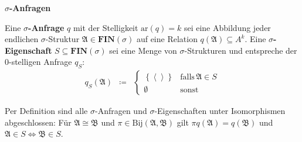\begin{defn}
\textbf{$\sigma$-Anfragen}

Eine $\sigma$\textbf{-Anfrage} $q$ mit der Stelligkeit $\mathrm{ar}\left(q\right)=k$
sei eine Abbildung jeder endlichen $\sigma$-Struktur $\mathfrak{A}\in\mathbf{FIN}\left(\sigma\right)$
auf eine Relation $q\left(\mathfrak{A}\right)\subseteq A^{k}$. Eine
$\sigma$\textbf{-Eigenschaft} $S\subseteq\mathbf{FIN}\left(\sigma\right)$
sei eine Menge von $\sigma$-Strukturen und entspreche der 0-stelligen
Anfrage $q_{S}$:
\begin{eqnarray*}
q_{S}\left(\mathfrak{A}\right) & \coloneqq & \begin{cases}
\left\{ \left\langle \right\rangle \right\}  & \mathrm{falls}\,\mathfrak{A}\in S\\
\emptyset & \mathrm{sonst}
\end{cases}
\end{eqnarray*}

Per Definition sind alle $\sigma$-Anfragen und $\sigma$-Eigenschaften
unter Isomorphismen abgeschlossen: Für $\mathfrak{A}\cong\mathfrak{B}$
und $\pi\in\mathrm{Bij}\left(\mathfrak{A},\mathfrak{B}\right)$ gilt
$\pi q\left(\mathfrak{A}\right)=q\left(\mathfrak{B}\right)$ und $\mathfrak{A}\in S\Leftrightarrow\mathfrak{B}\in S$.
\end{defn}

